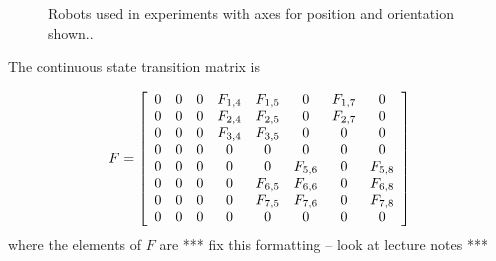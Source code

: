 \begin{figure}[ht!]
	\centering
	 \qquad
	\caption{Robots used in experiments with axes for position and orientation shown..}
	\label{fig:robotaxes}
\end{figure}

The continuous state transition matrix is

\begin{align}
\label{eq:kfF}
F = \left[\begin{array}{c c c c c c c c}
0 & 0 & 0 & F_{1,4} & F_{1,5} & 0 & F_{1,7} & 0 \\
0 & 0 & 0 & F_{2,4} & F_{2,5} & 0 & F_{2,7} & 0 \\
0 & 0 & 0 & F_{3,4} & F_{3,5} & 0 & 0 & 0 \\
0 & 0 & 0 & 0 & 0 & 0 & 0 & 0 \\
0 & 0 & 0 & 0 & 0 & F_{5,6} & 0 & F_{5,8} \\
0 & 0 & 0 & 0 & F_{6,5} & F_{6,6} & 0 & F_{6,8} \\
0 & 0 & 0 & 0 & F_{7,5} & F_{7,6} & 0 & F_{7,8} \\
0 & 0 & 0 & 0 & 0 & 0 & 0 & 0
\end{array}\right]
\end{align}
where the elements of $F$ are *** fix this formatting -- look at lecture notes ***


